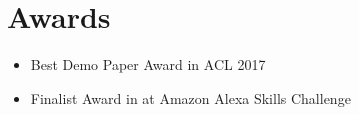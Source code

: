 \section{Awards}
\begin{itemize}
\setlength\itemsep{-5pt}
\item Best Demo Paper Award in ACL 2017
\item Finalist Award in at Amazon Alexa Skills Challenge
\end{itemize}